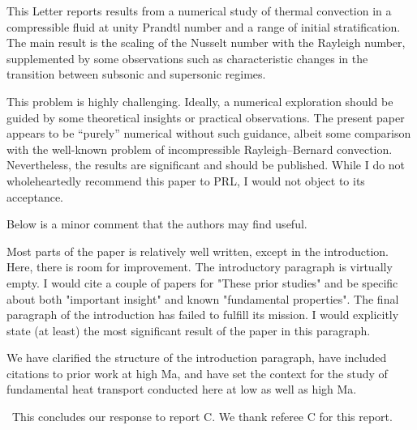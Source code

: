 \documentclass[aps, 11pt, singlecolumn]{revtex4-1} %
\begin{document}
\begin{singlespace}
\begin{myquotation}
This Letter reports results from a numerical study of thermal
convection in a compressible fluid at unity Prandtl number and a range
of initial stratification. The main result is the scaling of the
Nusselt number with the Rayleigh number, supplemented by some
observations such as characteristic changes in the transition between
subsonic and supersonic regimes.

This problem is highly challenging. Ideally, a numerical exploration
should be guided by some theoretical insights or practical
observations. The present paper appears to be ``purely'' numerical
without such guidance, albeit some comparison with the well-known
problem of incompressible Rayleigh--Bernard convection. Nevertheless,
the results are significant and should be published. While I do not
wholeheartedly recommend this paper to PRL, I would not object to its
acceptance.

Below is a minor comment that the authors may find useful.

Most parts of the paper is relatively well written, except in the
introduction. Here, there is room for improvement. The introductory
paragraph is virtually empty. I would cite a couple of papers for
"These prior studies" and be specific about both "important insight"
and known "fundamental properties". The final paragraph of the
introduction has failed to fulfill its mission. I would explicitly
state (at least) the most significant result of the paper in this
paragraph.
\end{myquotation}
We have clarified the structure of the introduction paragraph, have included
citations to prior work at high Ma, and have set the context for the study
of fundamental heat transport conducted here at low as well as high Ma.

$\,$\newline\noindent
This concludes our response to report C.  We thank referee C for this report.

$\,$
\newline
\noindent


\end{singlespace}





\end{document}
